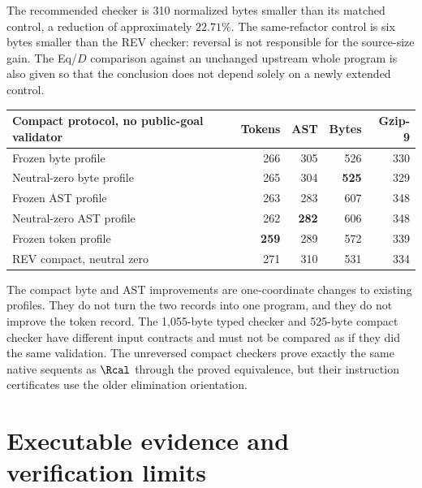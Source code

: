 The recommended checker is 310 normalized bytes smaller than its
matched control, a reduction of approximately $22.71\%$. The
same-refactor control is six bytes smaller than the REV checker:
reversal is not responsible for the source-size gain. The Eq/$D$
comparison against an unchanged upstream whole program is also given
so that the conclusion does not depend solely on a newly extended
control.

\begin{center}\small
\begin{tabular}{@{}lrrrr@{}}
\toprule
Compact protocol, no public-goal validator & Tokens & AST & Bytes & Gzip-9\\
\midrule
Frozen byte profile & 266 & 305 & 526 & 330\\
Neutral-zero byte profile & 265 & 304 & \textbf{525} & 329\\
Frozen AST profile & 263 & 283 & 607 & 348\\
Neutral-zero AST profile & 262 & \textbf{282} & 606 & 348\\
Frozen token profile & \textbf{259} & 289 & 572 & 339\\
REV compact, neutral zero & 271 & 310 & 531 & 334\\
\bottomrule
\end{tabular}
\end{center}

The compact byte and AST improvements are one-coordinate changes to
existing profiles. They do not turn the two records into one program,
and they do not improve the token record. The 1,055-byte typed checker
and 525-byte compact checker have different input contracts and must
not be compared as if they did the same validation. The unreversed
compact checkers prove exactly the same native sequents as $\Rcal$
through the proved equivalence, but their instruction certificates use
the older elimination orientation.

\section{Executable evidence and verification limits}
\label{sec:validation}

